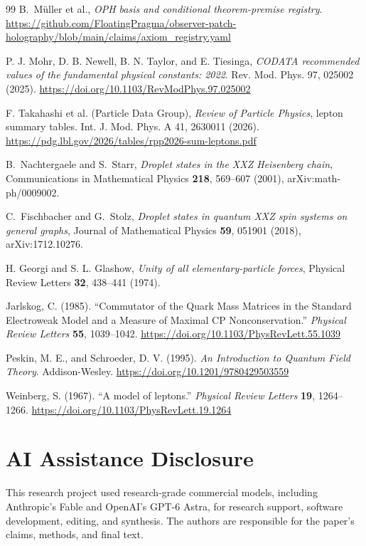 \documentclass[11pt]{article}
\begin{document}
\begin{thebibliography}{99}
B.\ M\"uller et al.,
\emph{OPH basis and conditional theorem-premise registry}.
\url{https://github.com/FloatingPragma/observer-patch-holography/blob/main/claims/axiom_registry.yaml}

P. J. Mohr, D. B. Newell, B. N. Taylor, and E. Tiesinga,
\emph{CODATA recommended values of the fundamental physical constants: 2022}.
Rev. Mod. Phys. 97, 025002 (2025).
\url{https://doi.org/10.1103/RevModPhys.97.025002}

F. Takahashi et al. (Particle Data Group),
\emph{Review of Particle Physics}, lepton summary tables.
Int. J. Mod. Phys. A 41, 2630011 (2026).
\url{https://pdg.lbl.gov/2026/tables/rpp2026-sum-leptons.pdf}

B.\ Nachtergaele and S.\ Starr,
\emph{Droplet states in the XXZ Heisenberg chain},
Communications in Mathematical Physics \textbf{218}, 569--607 (2001), arXiv:math-ph/0009002.

C.\ Fischbacher and G.\ Stolz,
\emph{Droplet states in quantum XXZ spin systems on general graphs},
Journal of Mathematical Physics \textbf{59}, 051901 (2018), arXiv:1712.10276.

H. Georgi and S. L. Glashow,
\emph{Unity of all elementary-particle forces},
Physical Review Letters \textbf{32}, 438--441 (1974).

Jarlskog, C. (1985). ``Commutator of the Quark Mass Matrices in the Standard Electroweak Model and a Measure of Maximal CP Nonconservation.'' \emph{Physical Review Letters} \textbf{55}, 1039--1042. \url{https://doi.org/10.1103/PhysRevLett.55.1039}

Peskin, M. E., and Schroeder, D. V. (1995). \emph{An Introduction to Quantum Field Theory}. Addison-Wesley. \url{https://doi.org/10.1201/9780429503559}

Weinberg, S. (1967). ``A model of leptons.'' \emph{Physical Review Letters} \textbf{19}, 1264--1266. \url{https://doi.org/10.1103/PhysRevLett.19.1264}

\end{thebibliography}

\section*{AI Assistance Disclosure}
This research project used research-grade commercial models, including
Anthropic's Fable and OpenAI's GPT-6 Astra, for research support, software
development, editing, and synthesis. The authors are responsible for the
paper's claims, methods, and final text.
\end{document}
